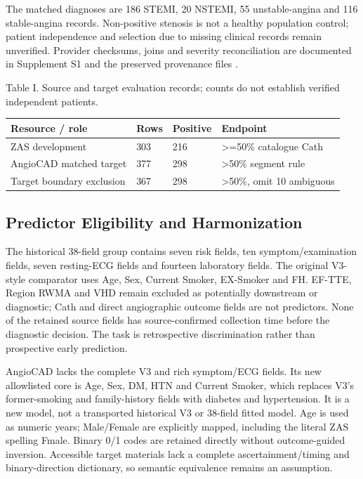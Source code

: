 \documentclass[conference,10pt]{IEEEtran}
\begin{document}
The matched diagnoses are 186 STEMI, 20 NSTEMI, 55 unstable-angina and 116 stable-angina records. Non-positive stenosis is not a healthy population control; patient independence and selection due to missing clinical records remain unverified. Provider checksums, joins and severity reconciliation are documented in Supplement S1 and the preserved provenance files \cite{r4,r14}.

\begin{center}\begin{minipage}{\columnwidth}\centering\footnotesize
Table I. Source and target evaluation records; counts do not establish verified independent patients.\par\vspace{3pt}
\setlength{\tabcolsep}{2.5pt}
\begin{tabular}{p{}p{}p{}p{}}
\toprule
Resource / role & Rows & Positive & Endpoint \\
\midrule
ZAS development & 303 & 216 & >=50\% catalogue Cath \\
AngioCAD matched target & 377 & 298 & >50\% segment rule \\
Target boundary exclusion & 367 & 298 & >50\%, omit 10 ambiguous \\
\bottomrule
\end{tabular}
\end{minipage}\end{center}
\subsection{Predictor Eligibility and Harmonization}
The historical 38-field group contains seven risk fields, ten symptom/examination fields, seven resting-ECG fields and fourteen laboratory fields. The original V3-style comparator uses Age, Sex, Current Smoker, EX-Smoker and FH. EF-TTE, Region RWMA and VHD remain excluded as potentially downstream or diagnostic; Cath and direct angiographic outcome fields are not predictors. None of the retained source fields has source-confirmed collection time before the diagnostic decision. The task is retrospective discrimination rather than prospective early prediction.

AngioCAD lacks the complete V3 and rich symptom/ECG fields. Its new allowlisted core is Age, Sex, DM, HTN and Current Smoker, which replaces V3's former-smoking and family-history fields with diabetes and hypertension. It is a new model, not a transported historical V3 or 38-field fitted model. Age is used as numeric years; Male/Female are explicitly mapped, including the literal ZAS spelling Fmale. Binary 0/1 codes are retained directly without outcome-guided inversion. Accessible target materials lack a complete ascertainment/timing and binary-direction dictionary, so semantic equivalence remains an assumption.
\end{document}
